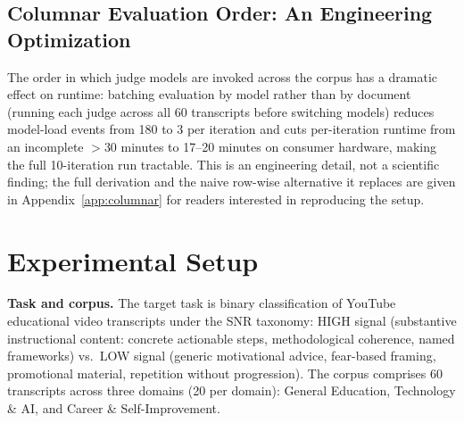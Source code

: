 \documentclass[11pt]{article}
\begin{document}
\subsection{Columnar Evaluation Order: An Engineering Optimization}
\label{sec:columnar}

The order in which judge models are invoked across the corpus has a
dramatic effect on runtime: batching evaluation by model rather than by
document (running each judge across all 60 transcripts before switching
models) reduces model-load events from 180 to 3 per iteration and cuts
per-iteration runtime from an incomplete $>$30 minutes to 17--20 minutes on
consumer hardware, making the full 10-iteration run tractable. This is an
engineering detail, not a scientific finding; the full derivation and the
naive row-wise alternative it replaces are given in
Appendix~\ref{app:columnar} for readers interested in reproducing the
setup.

\section{Experimental Setup}
\label{sec:experimentalsetup}

\textbf{Task and corpus.} The target task is binary classification of YouTube
educational video transcripts under the SNR taxonomy: HIGH signal (substantive
instructional content: concrete actionable steps, methodological coherence,
named frameworks) vs.\ LOW signal (generic motivational advice, fear-based
framing, promotional material, repetition without progression). The corpus
comprises 60 transcripts across three domains (20 per domain): General
Education, Technology \& AI, and Career \& Self-Improvement.
\end{document}
